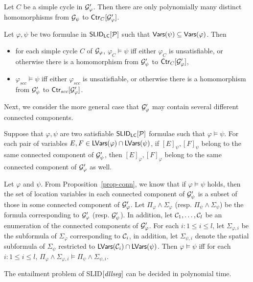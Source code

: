 \documentclass{llncs}
\begin{document}
\begin{proposition}
Let $C$ be a simple cycle in $\mathcal{G}'_\varphi$. Then there are only polynomially many distinct homomorphisms from $\mathcal{G}_\psi$ to ${\sf Ctr}_C[\mathcal{G}'_\varphi]$.
\end{proposition}


\vspace{-4mm}
\begin{lemma}\label{lem-hom}
Let $\varphi,\psi$ be two formulae in ${\sf SLID_{LC} }[\mathcal{P}]$ such that $\mathsf{Vars}(\psi) \subseteq \mathsf{Vars}(\varphi)$. Then
\vspace{-1mm}
\begin{itemize}
\item for each simple cycle $C$ of $\mathcal{G}_\varphi$, $\varphi_C \models \psi$ iff either $\varphi_C$ is unsatisfiable, or otherwise there is a homomorphism from $\mathcal{G}'_\psi$ to $ {\sf Ctr}_C[\mathcal{G}'_\varphi]$,
\item $\varphi_{scc} \models \psi$ iff either $\varphi_{scc}$ is unsatisfiable, or otherwise there is a homomorphism from $\mathcal{G}'_\psi$ to ${\sf Ctr}_{scc}[\mathcal{G}'_\varphi]$.
\end{itemize}
\end{lemma}
\vspace{-2mm}

Next, we consider the more general case that $\mathcal{G}'_\varphi$ may contain several different connected components.

\vspace{-1mm}
\begin{proposition}\label{prop-conn}
Suppose that $\varphi, \psi$ are two satisfiable ${\sf SLID_{LC} }[\mathcal{P}]$ formulae such that $\varphi  \models \psi$. For each pair of variables $E, F \in \mathsf{LVars}(\varphi) \cap \mathsf{LVars}(\psi)$, if $[E]_\psi, [F]_\psi$ belong to the same connected component of $\mathcal{G}'_\psi$, then $[E]_\varphi, [F]_\varphi$ belong to the same connected component of $\mathcal{G}'_\varphi$ as well.
\end{proposition}
\vspace{-1mm}


Let $\varphi$ and $\psi$. From Proposition~\ref{prop-conn}, we know that if $\varphi  \models \psi$ holds, then the set of location variables in each connected component of $\mathcal{G}'_\psi$ is a subset of those in some connected component of $\mathcal{G}'_\varphi$. Let $ \Pi_\varphi \wedge \Sigma_\varphi$ (resp. $ \Pi_\psi \wedge \Sigma_\psi$) be the formula corresponding to $\mathcal{G}'_\varphi$ (resp. $\mathcal{G}'_\psi$). In addition, let $\mathcal{C}_1,\dots, \mathcal{C}_l$ be  an enumeration of the connected components of $\mathcal{G}'_\varphi$. For each $i: 1 \le i \le l$, let $\Sigma_{\varphi, i}$ be the subformula of $\Sigma_\varphi$ corresponding to $\mathcal{C}_i$, in addition, let $\Sigma_{\psi, i}$ denote the spatial subformula of $\Sigma_\psi$ restricted to $\mathsf{LVars}(\mathcal{C}_i) \cap \mathsf{LVars}(\psi)$.  Then $\varphi \models \psi$ iff for each $i: 1 \le i \le l$, $\Pi_\varphi \wedge \Sigma_{\varphi, i} \vDash \Pi_\psi \wedge \Sigma_{\psi, i}$.


\begin{theorem}
The entailment problem of SLID$[\mathit{dllseg}]$ can be decided in polynomial time.
\end{theorem}





\end{document}
